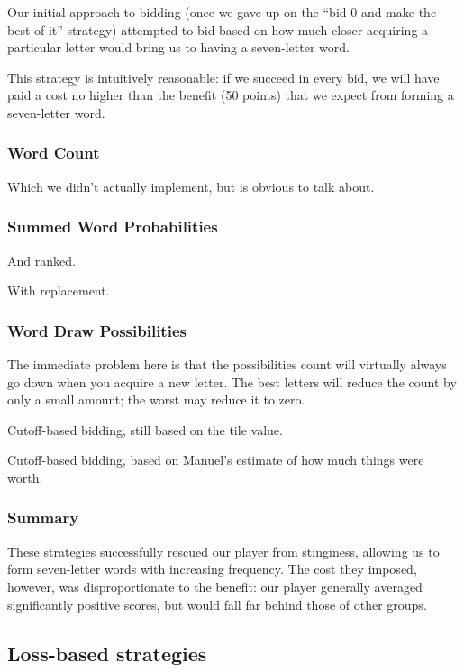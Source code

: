 \documentclass[11pt]{article}
\begin{document}
Our initial approach to bidding (once we gave up on the ``bid 0 and make the best of it'' strategy) attempted to bid based on how much closer acquiring a particular letter would bring us to having a seven-letter word.  

This strategy is intuitively reasonable: if we succeed in every bid, we will have paid a cost no higher than the benefit (50 points) that we expect from forming a seven-letter word.

\subsubsection{Word Count}

Which we didn't actually implement, but is obvious to talk about.

\subsubsection{Summed Word Probabilities}

And ranked.

With replacement.

\subsubsection{Word Draw Possibilities}

The immediate problem here is that the possibilities count will virtually always go down when you acquire a new letter.  The best letters will reduce the count by only a small amount; the worst may reduce it to zero.

Cutoff-based bidding, still based on the tile value.

Cutoff-based bidding, based on Manuel's  %
estimate of how much things were worth. 

\subsubsection{Summary}

These strategies successfully rescued our player from stinginess, allowing us to form seven-letter words with increasing frequency.  The cost they imposed, however, was disproportionate to the benefit: our player generally averaged significantly positive scores, but would fall far behind those of other groups.

\subsection{Loss-based strategies}
\end{document}
